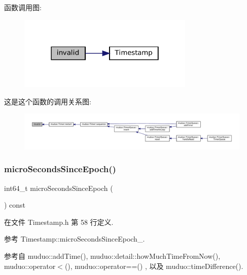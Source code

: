 函数调用图\+:
\nopagebreak
\begin{figure}[H]
\begin{center}
\leavevmode
\includegraphics[width=238pt]{classmuduo_1_1Timestamp_a1aa83f32d706090ef354b182460d27aa_cgraph}
\end{center}
\end{figure}
这是这个函数的调用关系图\+:
\nopagebreak
\begin{figure}[H]
\begin{center}
\leavevmode
\includegraphics[width=350pt]{classmuduo_1_1Timestamp_a1aa83f32d706090ef354b182460d27aa_icgraph}
\end{center}
\end{figure}
\mbox{\label{classmuduo_1_1Timestamp_a8a0616b73c803b94f5c0e9d00fa96fb4}} 
\subsubsection{\texorpdfstring{micro\+Seconds\+Since\+Epoch()}{microSecondsSinceEpoch()}}
{\footnotesize\ttfamily int64\+\_\+t micro\+Seconds\+Since\+Epoch (\begin{DoxyParamCaption}{ }\end{DoxyParamCaption}) const\hspace{0.3cm}{\ttfamily [inline]}}



在文件 Timestamp.\+h 第 58 行定义.



参考 Timestamp\+::micro\+Seconds\+Since\+Epoch\+\_\+.



参考自 muduo\+::add\+Time(), muduo\+::detail\+::how\+Much\+Time\+From\+Now(), muduo\+::operator$<$(), muduo\+::operator==() , 以及 muduo\+::time\+Difference().

